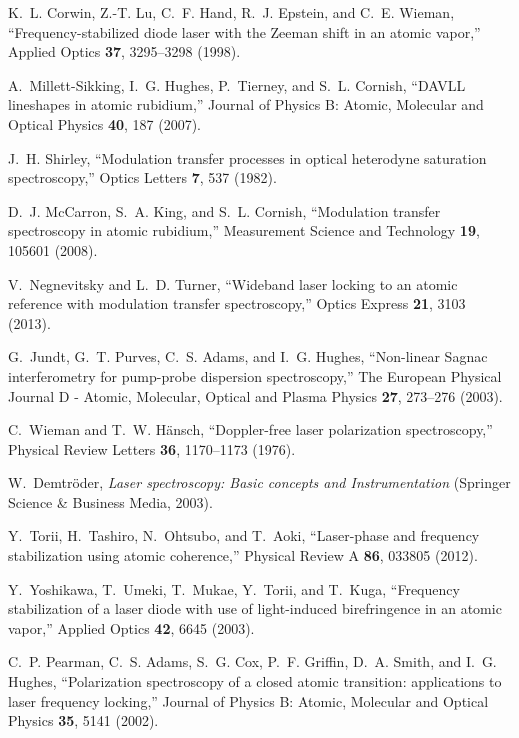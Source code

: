 \documentclass[10pt,letterpaper]{article}
\begin{document}
\begin{thebibliography}{10}
K.~L. Corwin, Z.-T. Lu, C.~F. Hand, R.~J. Epstein, and C.~E. Wieman,
  \enquote{Frequency-stabilized diode laser with the Zeeman shift in
  an atomic vapor,} Applied Optics \textbf{37}, 3295--3298 (1998).

A.~Millett-Sikking, I.~G. Hughes, P.~Tierney, and S.~L. Cornish,
  \enquote{{DAVLL} lineshapes in atomic rubidium,} Journal of Physics B:
  Atomic, Molecular and Optical Physics \textbf{40}, 187 (2007).

J.~H. Shirley, \enquote{Modulation transfer processes in optical heterodyne
  saturation spectroscopy,} Optics Letters \textbf{7}, 537 (1982).

D.~J. McCarron, S.~A. King, and S.~L. Cornish, \enquote{Modulation transfer
  spectroscopy in atomic rubidium,} Measurement Science and Technology
  \textbf{19}, 105601 (2008).

V.~Negnevitsky and L.~D. Turner, \enquote{Wideband laser locking to an atomic
  reference with modulation transfer spectroscopy,} Optics Express \textbf{21},
  3103 (2013).

G.~Jundt, G.~T. Purves, C.~S. Adams, and I.~G. Hughes, \enquote{Non-linear
  {Sagnac} interferometry for pump-probe dispersion spectroscopy,} The European
  Physical Journal D - Atomic, Molecular, Optical and Plasma Physics
  \textbf{27}, 273--276 (2003).

C.~Wieman and T.~W. H\"ansch, \enquote{Doppler-free laser polarization
  spectroscopy,} Physical Review Letters \textbf{36}, 1170--1173 (1976).

W.~Demtr\"oder, \emph{Laser spectroscopy: Basic concepts and
  Instrumentation} (Springer Science \& Business Media, 2003).
  
Y.~Torii, H.~Tashiro, N.~Ohtsubo, and T.~Aoki, \enquote{Laser-phase and
  frequency stabilization using atomic coherence,} Physical Review A
  \textbf{86}, 033805 (2012).

Y.~Yoshikawa, T.~Umeki, T.~Mukae, Y.~Torii, and T.~Kuga, \enquote{Frequency
  stabilization of a laser diode with use of light-induced
  birefringence in an atomic vapor,} Applied Optics \textbf{42}, 6645
  (2003).

C.~P. Pearman, C.~S. Adams, S.~G. Cox, P.~F. Griffin, D.~A. Smith, and I.~G.
  Hughes, \enquote{Polarization spectroscopy of a closed atomic transition:
  applications to laser frequency locking,} Journal of Physics B: Atomic,
  Molecular and Optical Physics \textbf{35}, 5141 (2002).


\end{thebibliography}
\end{document}
